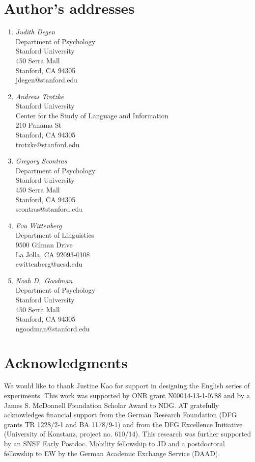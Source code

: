 \documentclass[11pt]{article}
\begin{document}
\section*{Author's addresses}
\begin{enumerate}
\item \emph{Judith Degen}\\ Department of Psychology\\ Stanford University\\ 450 Serra Mall\\ Stanford, CA 94305\\ jdegen@stanford.edu
\item \emph{Andreas Trotzke}\\ Stanford University\\ Center for the Study of Language and Information\\ 210 Panama St \\ Stanford, CA 94305\\ trotzke@stanford.edu
\item \emph{Gregory Scontras}\\ Department of Psychology\\ Stanford University\\ 450 Serra Mall\\ Stanford, CA 94305\\ scontras@stanford.edu
\item \emph{Eva Wittenberg}\\ Department of Linguistics \\ 9500 Gilman Drive\\
La Jolla, CA 92093-0108\\ ewittenberg@ucsd.edu
\item \emph{Noah D.~Goodman}\\ Department of Psychology\\ Stanford University\\ 450 Serra Mall\\ Stanford, CA 94305\\ ngoodman@stanford.edu
\end{enumerate}


\section*{Acknowledgments}
We would like to thank Justine Kao for support in designing the English series of experiments. This work was supported by ONR grant N00014-13-1-0788 and by a James S. McDonnell Foundation Scholar Award to NDG. AT gratefully acknowledges financial support from the German Research Foundation (DFG grants TR 1228/2-1 and BA 1178/9-1) and from the DFG Excellence Initiative (University of Konstanz, project no. 610/14). This research was further supported by an SNSF Early Postdoc. Mobility fellowship to JD and a postdoctoral fellowship to EW by the German Academic Exchange Service (DAAD).
\end{document}
